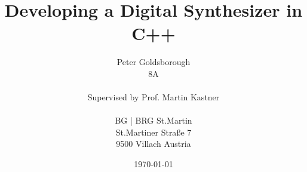 \title{Developing a Digital Synthesizer in C++}

\author{
Peter Goldsborough \\
8A\\\\
Supervised by Prof. Martin Kastner\\\\
BG | BRG St.Martin\\
St.Martiner Stra{\ss}e 7\\
9500 Villach
Austria
}

\date{\today}

\maketitle
